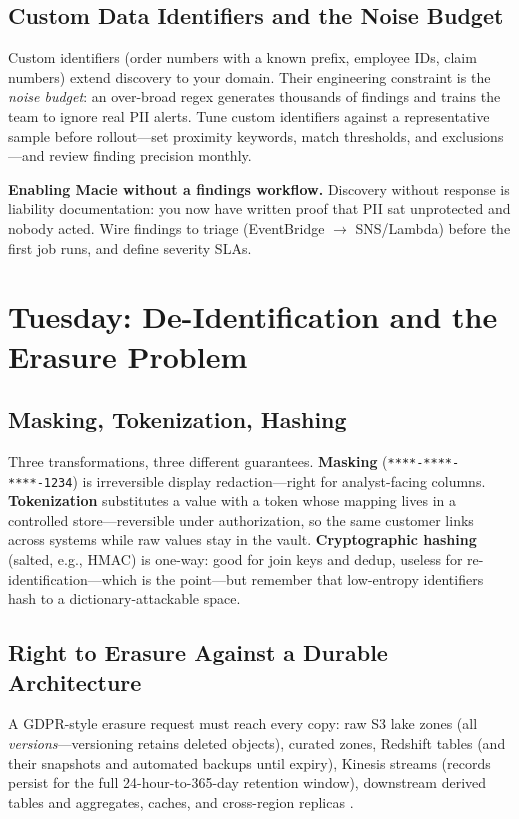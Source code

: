 \subsection{Custom Data Identifiers and the Noise Budget}
Custom identifiers (order numbers with a known prefix, employee IDs, claim numbers) extend discovery to your domain. Their engineering constraint is the \emph{noise budget}: an over-broad regex generates thousands of findings and trains the team to ignore real PII alerts. Tune custom identifiers against a representative sample before rollout---set proximity keywords, match thresholds, and exclusions---and review finding precision monthly.

\begin{pitfall}
\textbf{Enabling Macie without a findings workflow.} Discovery without response is liability documentation: you now have written proof that PII sat unprotected and nobody acted. Wire findings to triage (EventBridge $\rightarrow$ SNS/Lambda) before the first job runs, and define severity SLAs.
\end{pitfall}

\section{Tuesday: De-Identification and the Erasure Problem}
\subsection{Masking, Tokenization, Hashing}
Three transformations, three different guarantees. \textbf{Masking} (\texttt{****-****-****-1234}) is irreversible display redaction---right for analyst-facing columns. \textbf{Tokenization} substitutes a value with a token whose mapping lives in a controlled store---reversible under authorization, so the same customer links across systems while raw values stay in the vault. \textbf{Cryptographic hashing} (salted, e.g., HMAC) is one-way: good for join keys and dedup, useless for re-identification---which is the point---but remember that low-entropy identifiers hash to a dictionary-attackable space.

\subsection{Right to Erasure Against a Durable Architecture}
A GDPR-style erasure request must reach every copy: raw S3 lake zones (all \emph{versions}---versioning retains deleted objects), curated zones, Redshift tables (and their snapshots and automated backups until expiry), Kinesis streams (records persist for the full 24-hour-to-365-day retention window), downstream derived tables and aggregates, caches, and cross-region replicas \cite{awsS3ObjectLock,awsS3Replication}.

